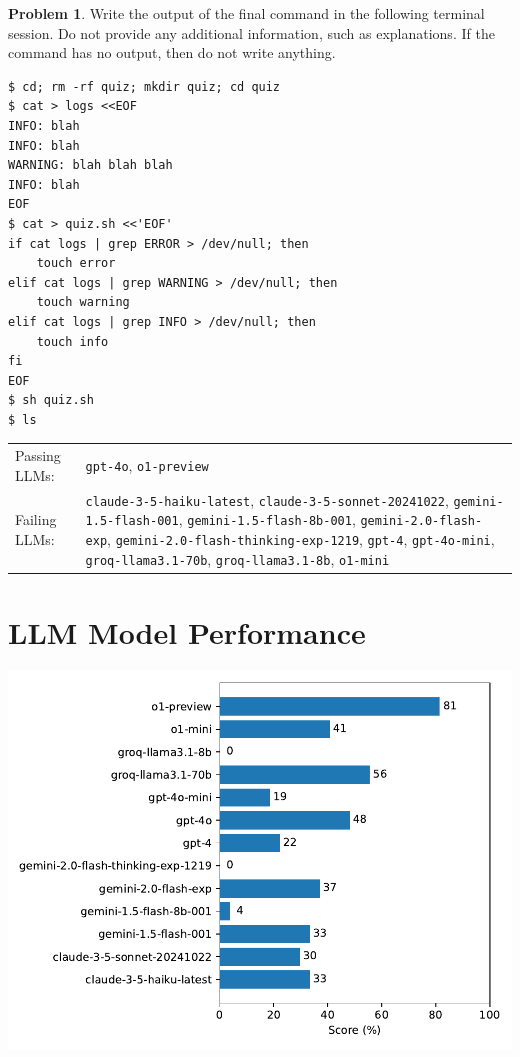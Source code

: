 \documentclass[10pt]{article}
\theoremstyle{definition}
\newtheorem{problem}{Problem}
\begin{document}
\noindent\vspace{0.1in}\begin{minipage}{\textwidth}

\begin{problem}
Write the output of the final command in the following terminal session.
Do not provide any additional information,
such as explanations.
If the command has no output,
then do not write anything.

\end{problem}
\begin{lstlisting}
$ cd; rm -rf quiz; mkdir quiz; cd quiz
$ cat > logs <<EOF
INFO: blah
INFO: blah
WARNING: blah blah blah
INFO: blah
EOF
$ cat > quiz.sh <<'EOF'
if cat logs | grep ERROR > /dev/null; then
    touch error
elif cat logs | grep WARNING > /dev/null; then
    touch warning
elif cat logs | grep INFO > /dev/null; then
    touch info
fi
EOF
$ sh quiz.sh
$ ls
\end{lstlisting}


\noindent
\begin{tabular}{p{1.0in}L{5in}}
Passing LLMs: & {\lstinline$gpt-4o$}, {\lstinline$o1-preview$} \\
Failing LLMs: & {\lstinline$claude-3-5-haiku-latest$}, {\lstinline$claude-3-5-sonnet-20241022$}, {\lstinline$gemini-1.5-flash-001$}, {\lstinline$gemini-1.5-flash-8b-001$}, {\lstinline$gemini-2.0-flash-exp$}, {\lstinline$gemini-2.0-flash-thinking-exp-1219$}, {\lstinline$gpt-4$}, {\lstinline$gpt-4o-mini$}, {\lstinline$groq-llama3.1-70b$}, {\lstinline$groq-llama3.1-8b$}, {\lstinline$o1-mini$} \\
\end{tabular}

\end{minipage}

\section*{LLM Model Performance}
\includegraphics{llm_scores}
\end{document}
